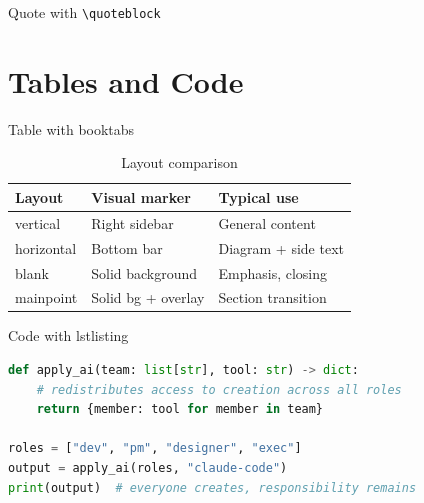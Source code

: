 \documentclass[aspectratio=169,t,xcolor=table]{beamer}
\begin{document}
\begin{frame}{Quote with \texttt{\textbackslash quoteblock}}


\end{frame}


\section[LightPurple]{Tables and Code}

\begin{frame}{Table with booktabs}

    \begin{table}[]
        \centering
        \caption{Layout comparison}
        \renewcommand{\arraystretch}{1.5}
        \setlength{\tabcolsep}{10pt}
        {
            \begin{tabular}{p{2.5cm}p{3.5cm}p{4cm}}
                \toprule
                \textbf{Layout}    & \textbf{Visual marker}    & \textbf{Typical use}          \\
                \midrule
                vertical           & Right sidebar             & General content               \\
                horizontal         & Bottom bar                & Diagram + side text           \\
                blank              & Solid background          & Emphasis, closing             \\
                mainpoint          & Solid bg + overlay        & Section transition            \\
                \bottomrule
            \end{tabular}
        }
    \end{table}

\end{frame}

\begin{frame}[fragile]{Code with lstlisting}

    \begin{lstlisting}[language=Python, caption=Redistributing access with AI]
def apply_ai(team: list[str], tool: str) -> dict:
    # redistributes access to creation across all roles
    return {member: tool for member in team}

roles = ["dev", "pm", "designer", "exec"]
output = apply_ai(roles, "claude-code")
print(output)  # everyone creates, responsibility remains
    \end{lstlisting}

\end{frame}
\end{document}
